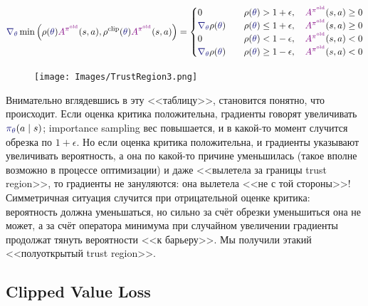 $$\textcolor{ChadBlue}{\nabla_\theta} \min \left( \rho(\textcolor{ChadBlue}{\theta}) \textcolor{ChadPurple}{A^{\pi^{\old}}}(s, a), \rho^{\clip}(\textcolor{ChadBlue}{\theta}) \textcolor{ChadPurple}{A^{\pi^{\old}}}(s, a)\right) = 
\begin{cases}
0 \qquad & \rho(\textcolor{ChadBlue}{\theta}) > 1 + \epsilon, \quad \textcolor{ChadPurple}{A^{\pi^{\old}}}(s, a) \ge 0 \\
\textcolor{ChadBlue}{\nabla_\theta} \rho(\textcolor{ChadBlue}{\theta}) \quad &\rho(\textcolor{ChadBlue}{\theta}) \le 1 + \epsilon, \quad \textcolor{ChadPurple}{A^{\pi^{\old}}}(s, a) \ge 0 \\
0 \qquad & \rho(\textcolor{ChadBlue}{\theta}) < 1 - \epsilon, \quad \textcolor{ChadPurple}{A^{\pi^{\old}}}(s, a) < 0 \\
\textcolor{ChadBlue}{\nabla_\theta} \rho(\textcolor{ChadBlue}{\theta}) \quad &\rho(\textcolor{ChadBlue}{\theta}) \ge 1 - \epsilon, \quad \textcolor{ChadPurple}{A^{\pi^{\old}}}(s, a) < 0 \\
\end{cases}
$$

\begin{figure}
\vspace{-0.4cm}
\centering
\texttt{[image: Images/TrustRegion3.png]}
\vspace{-0.4cm}
\end{figure}
Внимательно вглядевшись в эту <<таблицу>>, становится понятно, что происходит. Если оценка критика положительна, градиенты говорят увеличивать $\textcolor{ChadBlue}{\pi_\theta}(a \mid s)$; importance sampling вес повышается, и в какой-то момент случится обрезка по $1 + \epsilon$. Но если оценка критика положительна, и градиенты указывают увеличивать вероятность, а она по какой-то причине уменьшилась (такое вполне возможно в процессе оптимизации) и даже <<вылетела за границы trust region>>, то градиенты не зануляются: она вылетела <<не с той стороны>>! Симметричная ситуация случится при отрицательной оценке критика: вероятность должна уменьшаться, но сильно за счёт обрезки уменьшиться она не может, а за счёт оператора минимума при случайном увеличении градиенты продолжат тянуть вероятности <<к барьеру>>. Мы получили этакий <<полуоткрытый trust region>>.

\subsection{Clipped Value Loss}

